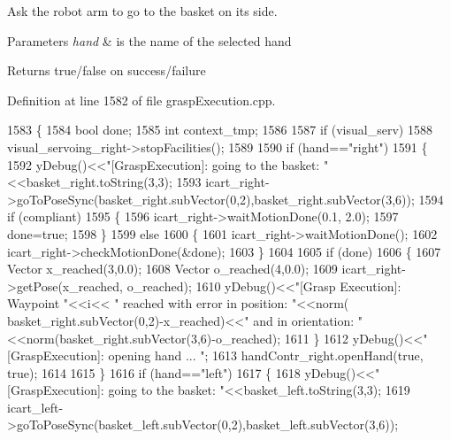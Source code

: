 Ask the robot arm to go to the basket on its side. 


\begin{DoxyParams}{Parameters}
{\em hand} & is the name of the selected hand \\
\hline
\end{DoxyParams}
\begin{DoxyReturn}{Returns}
true/false on success/failure 
\end{DoxyReturn}


Definition at line 1582 of file grasp\+Execution.\+cpp.


\begin{DoxyCode}
1583 \{
1584     \textcolor{keywordtype}{bool} done;
1585     \textcolor{keywordtype}{int} context\_tmp;
1586 
1587     \textcolor{keywordflow}{if} (visual\_serv)
1588         visual_servoing_right->stopFacilities();
1589 
1590     \textcolor{keywordflow}{if} (hand==\textcolor{stringliteral}{"right"})
1591     \{
1592         yDebug()<<\textcolor{stringliteral}{"[GraspExecution]: going to the basket: "}<<basket\_right.toString(3,3);
1593         icart\_right->goToPoseSync(basket\_right.subVector(0,2),basket\_right.subVector(3,6));
1594         \textcolor{keywordflow}{if} (compliant)
1595         \{
1596             icart\_right->waitMotionDone(0.1, 2.0);
1597             done=\textcolor{keyword}{true};
1598         \}
1599         \textcolor{keywordflow}{else}
1600         \{
1601             icart\_right->waitMotionDone();
1602             icart\_right->checkMotionDone(&done);
1603         \}
1604 
1605         \textcolor{keywordflow}{if} (done)
1606         \{
1607              Vector x\_reached(3,0.0);
1608              Vector o\_reached(4,0.0);
1609              icart\_right->getPose(x\_reached, o\_reached);
1610              yDebug()<<\textcolor{stringliteral}{"[Grasp Execution]: Waypoint "}<<i<< \textcolor{stringliteral}{" reached with error in position: "}<<norm(
      basket\_right.subVector(0,2)-x\_reached)<<\textcolor{stringliteral}{" and in orientation: "}<<norm(basket\_right.subVector(3,6)-o\_reached);
1611         \}
1612         yDebug()<<\textcolor{stringliteral}{"[GraspExecution]: opening hand ... "};
1613         handContr_right.openHand(\textcolor{keyword}{true}, \textcolor{keyword}{true});
1614 
1615     \}
1616     \textcolor{keywordflow}{if} (hand==\textcolor{stringliteral}{"left"})
1617     \{
1618         yDebug()<<\textcolor{stringliteral}{"[GraspExecution]: going to the basket: "}<<basket\_left.toString(3,3);
1619         icart\_left->goToPoseSync(basket\_left.subVector(0,2),basket\_left.subVector(3,6));

\end{DoxyCode}
